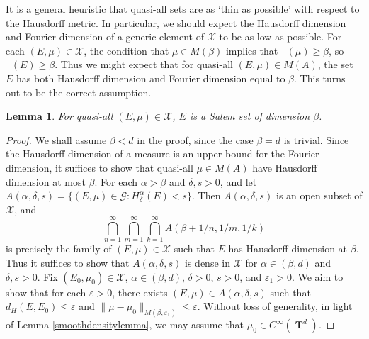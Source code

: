 \documentclass[12pt,reqno]{article}
\numberwithin{equation}{section}
\DeclareMathOperator{\hausdim}{\dim_{\mathbf{H}}}
\DeclareMathOperator{\fordim}{\dim_{\mathbf{F}}}
\DeclareMathOperator{\TT}{\mathbf{T}}
\newtheorem{lemma}[theorem]{Lemma}
\begin{document}
It is a general heuristic that quasi-all sets are as `thin as possible' with respect to the Hausdorff metric. In particular, we should expect the Hausdorff dimension and Fourier dimension of a generic element of $\mathcal{X}$ to be as low as possible. For each $(E,\mu) \in \mathcal{X}$, the condition that $\mu \in M(\beta)$ implies that $\fordim(\mu) \geq \beta$, so $\fordim(E) \geq \beta$. Thus we might expect that for quasi-all $(E,\mu) \in M(A)$, the set $E$ has both Hausdorff dimension and Fourier dimension equal to $\beta$. This turns out to be the correct assumption.

\begin{lemma}
    For quasi-all $(E,\mu) \in \mathcal{X}$, $E$ is a Salem set of dimension $\beta$.
\end{lemma}
\begin{proof}
    We shall assume $\beta < d$ in the proof, since the case $\beta = d$ is trivial. Since the Hausdorff dimension of a measure is an upper bound for the Fourier dimension, it suffices to show that quasi-all $\mu \in M(A)$ have Hausdorff dimension at most $\beta$. For each $\alpha > \beta$ and $\delta, s > 0$, and let $A(\alpha,\delta,s) = \{ (E,\mu) \in \mathcal{G}: H^\alpha_\delta(E) < s \}$. Then $A(\alpha,\delta,s)$ is an open subset of $\mathcal{X}$, and
    \[ \bigcap_{n = 1}^\infty \bigcap_{m = 1}^\infty \bigcap_{k = 1}^\infty A(\beta + 1/n, 1/m, 1/k) \]
    is precisely the family of $(E,\mu) \in \mathcal{X}$ such that $E$ has Hausdorff dimension at $\beta$.
%
    Thus it suffices to show that $A(\alpha,\delta,s)$ is dense in $\mathcal{X}$ for $\alpha \in (\beta,d)$ and $\delta, s > 0$. Fix $(E_0,\mu_0) \in \mathcal{X}$, $\alpha \in (\beta,d)$, $\delta > 0$, $s > 0$, and $\varepsilon_1 > 0$. We aim to show that for each $\varepsilon > 0$, there exists $(E,\mu) \in A(\alpha,\delta,s)$ such that $d_H(E,E_0) \leq \varepsilon$ and $\| \mu - \mu_0 \|_{M(\beta,\varepsilon_1)} \leq \varepsilon$. Without loss of generality, in light of Lemma \ref{smoothdensitylemma}, we may assume that $\mu_0 \in C^\infty(\TT^d)$.


\end{proof}
\end{document}
